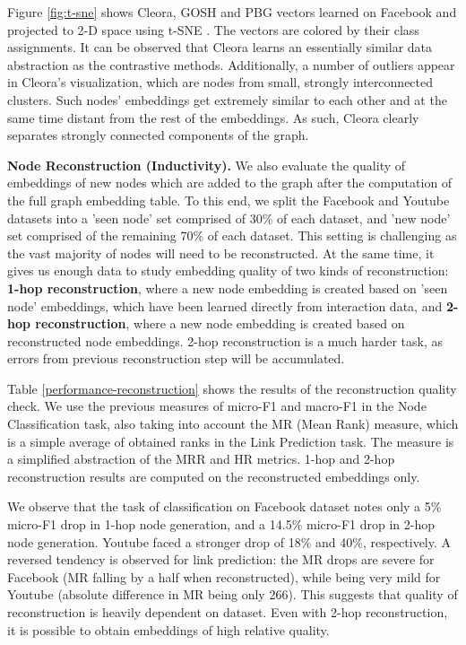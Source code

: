 \documentclass{IEEEtran}
\begin{document}
Figure \ref{fig:t-sne} shows Cleora, GOSH and PBG vectors learned on Facebook and projected to 2-D space using t-SNE \cite{vanDerMaaten2008}. The vectors are colored by their class assignments. It can be observed that Cleora learns an essentially similar data abstraction as the contrastive methods. Additionally, a number of outliers appear in Cleora's visualization, which are nodes from small, strongly interconnected clusters. Such nodes' embeddings get extremely similar to each other and at the same time distant from the rest of the embeddings. As such, Cleora clearly separates strongly connected components of the graph.


\textbf{Node Reconstruction (Inductivity).} We also evaluate the quality of embeddings of new nodes which are added to the graph after the computation of the full graph embedding table. To this end, we split the Facebook and Youtube datasets into a 'seen node' set comprised of 30\% of each dataset, and 'new node' set comprised of the remaining 70\% of each dataset. This setting is challenging as the vast majority of nodes will need to be reconstructed. At the same time, it gives us enough data to study embedding quality of two kinds of reconstruction: \textbf{1-hop reconstruction}, where a new node embedding is created based on 'seen node' embeddings, which have been learned directly from interaction data, and \textbf{2-hop reconstruction}, where a new node embedding is created based on reconstructed node embeddings. 2-hop reconstruction is a much harder task, as errors from previous reconstruction step will be accumulated.

Table \ref{performance-reconstruction} shows the results of the reconstruction quality check. We use the previous measures of micro-F1 and macro-F1 in the Node Classification task, also taking into account the MR (Mean Rank) measure, which is a simple average of obtained ranks in the Link Prediction task. The measure is a simplified abstraction of the MRR and HR metrics. 1-hop and 2-hop reconstruction results are computed on the reconstructed embeddings only.

We observe that the task of classification on Facebook dataset notes only a 5\% micro-F1 drop in 1-hop node generation, and a 14.5\% micro-F1 drop in 2-hop node generation. Youtube faced a stronger drop of 18\% and 40\%, respectively. A reversed tendency is observed for link prediction: the MR drops are severe for Facebook (MR falling by a half when reconstructed), while being very mild for Youtube (absolute difference in MR being only 266). This suggests that quality of reconstruction is heavily dependent on dataset. Even with 2-hop reconstruction, it is possible to obtain embeddings of  high relative quality.
\end{document}
